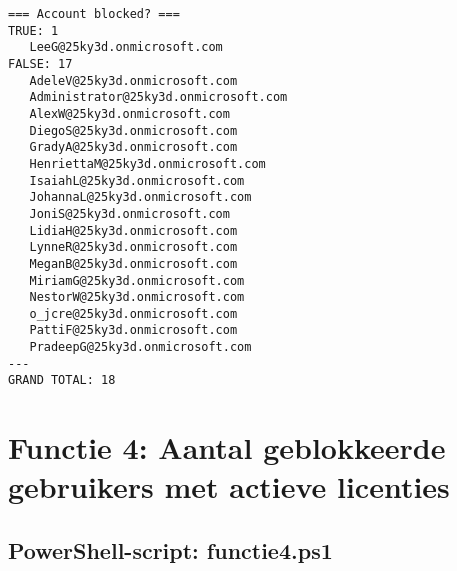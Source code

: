\begin{scriptsize}
\begin{verbatim}
=== Account blocked? ===
TRUE: 1
   LeeG@25ky3d.onmicrosoft.com
FALSE: 17
   AdeleV@25ky3d.onmicrosoft.com
   Administrator@25ky3d.onmicrosoft.com
   AlexW@25ky3d.onmicrosoft.com
   DiegoS@25ky3d.onmicrosoft.com
   GradyA@25ky3d.onmicrosoft.com
   HenriettaM@25ky3d.onmicrosoft.com
   IsaiahL@25ky3d.onmicrosoft.com
   JohannaL@25ky3d.onmicrosoft.com
   JoniS@25ky3d.onmicrosoft.com
   LidiaH@25ky3d.onmicrosoft.com
   LynneR@25ky3d.onmicrosoft.com
   MeganB@25ky3d.onmicrosoft.com
   MiriamG@25ky3d.onmicrosoft.com
   NestorW@25ky3d.onmicrosoft.com
   o_jcre@25ky3d.onmicrosoft.com
   PattiF@25ky3d.onmicrosoft.com
   PradeepG@25ky3d.onmicrosoft.com
---
GRAND TOTAL: 18
\end{verbatim}
\end{scriptsize}

\clearpage

\section{Functie 4: Aantal geblokkeerde gebruikers met actieve licenties}

\subsection{PowerShell-script: functie4.ps1}

